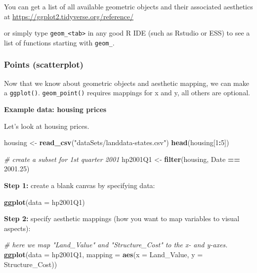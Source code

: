 \documentclass[]{book}
\newenvironment{Shaded}{\begin{snugshade}}{\end{snugshade}}
\newcommand{\CommentTok}[1]{\textcolor[rgb]{0.56,0.35,0.01}{\textit{#1}}}
\newcommand{\DataTypeTok}[1]{\textcolor[rgb]{0.13,0.29,0.53}{#1}}
\newcommand{\DecValTok}[1]{\textcolor[rgb]{0.00,0.00,0.81}{#1}}
\newcommand{\FloatTok}[1]{\textcolor[rgb]{0.00,0.00,0.81}{#1}}
\newcommand{\KeywordTok}[1]{\textcolor[rgb]{0.13,0.29,0.53}{\textbf{#1}}}
\newcommand{\NormalTok}[1]{#1}
\newcommand{\OperatorTok}[1]{\textcolor[rgb]{0.81,0.36,0.00}{\textbf{#1}}}
\newcommand{\StringTok}[1]{\textcolor[rgb]{0.31,0.60,0.02}{#1}}
\begin{document}
You can get a list of all available geometric objects and their associated aesthetics at \url{https://ggplot2.tidyverse.org/reference/}

or simply type \texttt{geom\_\textless{}tab\textgreater{}} in any good R IDE (such as Rstudio or ESS) to see a list of functions starting with \texttt{geom\_}.

\hypertarget{points-scatterplot}{%
\subsubsection{Points (scatterplot)}\label{points-scatterplot}}

Now that we know about geometric objects and aesthetic mapping, we can make a \texttt{ggplot()}. \texttt{geom\_point()} requires mappings for x and y, all others are optional.

\textbf{Example data: housing prices}

Let's look at housing prices.

\begin{Shaded}
\begin{Highlighting}[]
\NormalTok{housing <-}\StringTok{ }\KeywordTok{read_csv}\NormalTok{(}\StringTok{"dataSets/landdata-states.csv"}\NormalTok{)}
\KeywordTok{head}\NormalTok{(housing[}\DecValTok{1}\OperatorTok{:}\DecValTok{5}\NormalTok{])}

\CommentTok{# create a subset for 1st quarter 2001}
\NormalTok{hp2001Q1 <-}\StringTok{ }\KeywordTok{filter}\NormalTok{(housing, Date }\OperatorTok{==}\StringTok{ }\FloatTok{2001.25}\NormalTok{)}
\end{Highlighting}
\end{Shaded}

\textbf{Step 1:} create a blank canvas by specifying data:

\begin{Shaded}
\begin{Highlighting}[]
\KeywordTok{ggplot}\NormalTok{(}\DataTypeTok{data =}\NormalTok{ hp2001Q1)}
\end{Highlighting}
\end{Shaded}

\textbf{Step 2:} specify aesthetic mappings (how you want to map variables to visual aspects):

\begin{Shaded}
\begin{Highlighting}[]
\CommentTok{# here we map "Land_Value" and "Structure_Cost" to the x- and y-axes.}
\KeywordTok{ggplot}\NormalTok{(}\DataTypeTok{data =}\NormalTok{ hp2001Q1, }\DataTypeTok{mapping =} \KeywordTok{aes}\NormalTok{(}\DataTypeTok{x =}\NormalTok{ Land_Value, }\DataTypeTok{y =}\NormalTok{ Structure_Cost))}
\end{Highlighting}
\end{Shaded}
\end{document}
